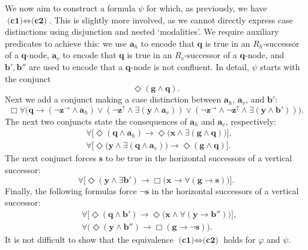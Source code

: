 \documentclass{lmcs} %
\theoremstyle{plain}\newtheorem{satz}[thm]{Satz} %
\newcommand{\avec}[1]{\boldsymbol{#1}}
\newcommand{\q}{{\avec{q}}}
\newcommand{\bbvarup}{\Zvar^\uparrow}
\newcommand{\bbvarright}{\Zvar^\to}
\newcommand{\ssvar}{\fform{s}}
\newcommand{\fform}[1]{\boldsymbol{#1}}
\newcommand{\qvar}{\fform{q}}
\newcommand{\avar}{\fform{a}}
\newcommand{\gvar}{\fform{g}}
\newcommand{\bvar}{\fform{b}}
\newcommand{\xvar}{\fform{x}}
\newcommand{\yvar}{\fform{y}}
\newcommand{\Zvar}{\fform{z}}
\newcommand{\Bv}{\forall}
\newcommand{\Bh}{\Box}
\newcommand{\Dv}{\exists}
\newcommand{\Dh}{\Diamond}
\begin{document}
	We now aim to construct a formula $\psi$ for which, as previously, 
	we have $\textbf{(c1)} \Leftrightarrow \textbf{(c2)}$.
	This is slightly more involved, as we cannot directly express case distinctions using disjunction and nested `modalities'.
	We require auxiliary predicates to achieve this:
	we use $\avar_{h}$ to encode that $\qvar$ is true in an $R_{h}$-successor of a $\qvar$-node,
	$\avar_{v}$ to encode that $\qvar$ is true in an $R_{v}$-successor of a $\qvar$-node,
	and $\bvar',\bvar''$ are used to encode that a $\qvar$-node is not confluent. In detail, $\psi$ starts with the conjunct
	$$
	\Diamond (\gvar \wedge \qvar).
	$$
	Next we add a conjunct making a case distinction between $\avar_{h}$, $\avar_{v}$, and $\bvar'$:
	$$
	\Bh\Bv\bigl(\qvar\to
	(\neg\bbvarright\land\avar_h)\lor
	(\neg\bbvarup\land\Dv(\yvar\land\avar_v)) 
	\lor(\neg\bbvarright\land\neg\bbvarup\land\Dv(\yvar\land\bvar'))
	\bigr).
	$$
	The next two conjuncts state the consequences of $\avar_{h}$ and $\avar_{v}$, respectively:
	\begin{align*}
		& \Bv\bigl[\Dh(\qvar \wedge \avar_{h}) \rightarrow \Dh\bigl(\xvar \wedge \Dv (\gvar \wedge \qvar)\bigr)\bigr], \\
		&
		\Bv\bigl[ \Dh \bigl(\yvar \wedge\Dv(\qvar\land\avar_{v})\bigr) \rightarrow \Dh (\gvar \wedge \qvar)\bigr].
	\end{align*}
	The next conjunct forces $\ssvar$ to be true in the horizontal successors of a vertical successor:
	$$
	\Bv \bigl[\Dh (\yvar \wedge \Dv\bvar' )\rightarrow \Bh \bigl(\xvar \rightarrow \Bv (\gvar \rightarrow \ssvar)\bigr)\bigr].
	$$ 
	Finally, the following formulas force $\neg\ssvar$ in the horizontal successors of a vertical successor:
	\begin{align*}
		&\Bv \bigl[\Dh (\qvar \wedge \bvar')\rightarrow \Dh \bigl(\xvar \wedge \Bv (\yvar \rightarrow \bvar'')\bigr)\bigr],\\
		&
		\Bv\bigl(\Dh (\yvar \wedge \bvar'') \rightarrow \Bh (\gvar \rightarrow \neg \ssvar)\bigr).
	\end{align*} 
	It is not difficult to show that the equivalence $\textbf{(c1)} \Leftrightarrow \textbf{(c2)}$ holds
	for $\varphi$ and $\psi$.
	
\end{document}
